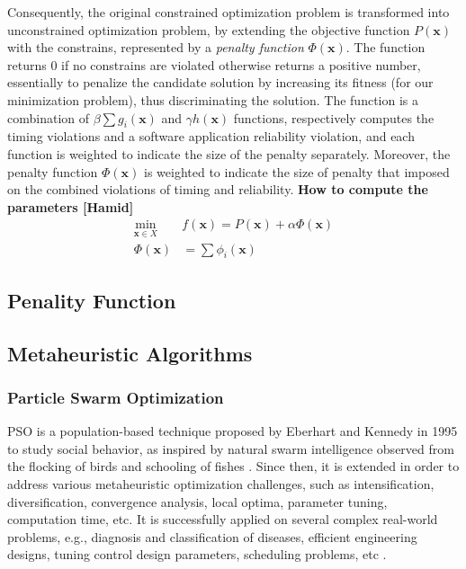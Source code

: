 Consequently, the original constrained optimization problem is transformed into unconstrained optimization problem, by extending the objective function $P(\textbf{x})$ with the constrains, represented by a \textit{penalty function} $\Phi(\textbf{x})$. The function returns 0 if no constrains are violated otherwise returns a positive number, essentially to penalize the candidate solution by increasing its fitness (for our minimization problem), thus discriminating the solution. The function is a combination of $\beta\sum{g_i(\textbf{x})}$ and $\gamma h(\textbf{x})$ functions, respectively computes the timing violations and a software application reliability violation, and each function is weighted to indicate the size of the penalty separately. Moreover, the penalty function $\Phi({\textbf{x}})$ is weighted to indicate the size of penalty that imposed on the combined violations of timing and reliability. \textbf{How to compute the parameters [Hamid]}
\begin{align}
\label{}
    \min_{\textbf{x}\in X}\;\;& f(\textbf{x})=P(\textbf{x}) + \alpha \Phi(\textbf{x})\\
    \label{eqn_penalityfunc}\Phi(\textbf{x}) &= \sum\phi_i(\textbf{x})
\end{align}

\subsection{Penality Function}

\subsection{Metaheuristic Algorithms}
\subsubsection{Particle Swarm Optimization}
PSO is a population-based technique proposed by Eberhart and Kennedy in 1995 to study social behavior, as inspired by natural swarm intelligence observed from the flocking of birds and schooling of fishes \cite{Kennedy1995ParticleOptimization}. Since then, it is extended in order to address various metaheuristic optimization challenges, such as intensification, diversification, convergence analysis, local optima, parameter tuning, computation time, etc. It is successfully applied on several complex real-world problems, e.g., diagnosis and classification of diseases, efficient engineering designs, tuning control design parameters, scheduling problems, etc \cite{Poli2008AnApplications}. 

